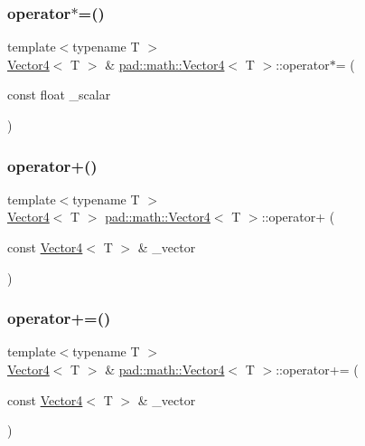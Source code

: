 \mbox{\label{structpad_1_1math_1_1_vector4_a33fee52eb7633acd92f85449d261b820}} 
\subsubsection{\texorpdfstring{operator$\ast$=()}{operator*=()}}
{\footnotesize\ttfamily template$<$typename T $>$ \\
\mbox{\hyperlink{structpad_1_1math_1_1_vector4}{Vector4}}$<$ T $>$ \& \mbox{\hyperlink{structpad_1_1math_1_1_vector4}{pad\+::math\+::\+Vector4}}$<$ T $>$\+::operator$\ast$= (\begin{DoxyParamCaption}\item[{const float}]{\+\_\+scalar }\end{DoxyParamCaption})}

\mbox{\label{structpad_1_1math_1_1_vector4_ac6b2370ae62f75e3dcb112427e3f518f}} 
\subsubsection{\texorpdfstring{operator+()}{operator+()}}
{\footnotesize\ttfamily template$<$typename T $>$ \\
\mbox{\hyperlink{structpad_1_1math_1_1_vector4}{Vector4}}$<$ T $>$ \mbox{\hyperlink{structpad_1_1math_1_1_vector4}{pad\+::math\+::\+Vector4}}$<$ T $>$\+::operator+ (\begin{DoxyParamCaption}\item[{const \mbox{\hyperlink{structpad_1_1math_1_1_vector4}{Vector4}}$<$ T $>$ \&}]{\+\_\+vector }\end{DoxyParamCaption})}

\mbox{\label{structpad_1_1math_1_1_vector4_aed8f9c0faacfe13f7985d5f4e4f73d23}} 
\subsubsection{\texorpdfstring{operator+=()}{operator+=()}}
{\footnotesize\ttfamily template$<$typename T $>$ \\
\mbox{\hyperlink{structpad_1_1math_1_1_vector4}{Vector4}}$<$ T $>$ \& \mbox{\hyperlink{structpad_1_1math_1_1_vector4}{pad\+::math\+::\+Vector4}}$<$ T $>$\+::operator+= (\begin{DoxyParamCaption}\item[{const \mbox{\hyperlink{structpad_1_1math_1_1_vector4}{Vector4}}$<$ T $>$ \&}]{\+\_\+vector }\end{DoxyParamCaption})}

